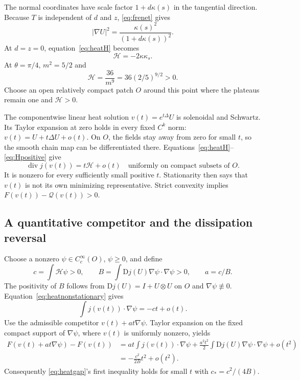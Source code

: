 \documentclass[11pt,a4paper]{article}
\theoremstyle{definition}
\theoremstyle{remark}
\newcommand{\Q}{\mathcal Q}
\newcommand{\diver}{\operatorname{div}}
\numberwithin{equation}{section}
\begin{document}
The normal coordinates have scale factor \(1+d\kappa(s)\) in the tangential direction. Because \(T\) is independent of \(d\) and \(z\), \eqref{eq:frenet} gives
\[
|\nabla U|^2=\frac{\kappa(s)^2}{(1+d\kappa(s))^2}.
\]
At \(d=z=0\), equation~\eqref{eq:heatH} becomes
\[
\mathscr H=-2\kappa\kappa_s.
\]
At \(\theta=\pi/4\), \(m^2=5/2\) and
\begin{equation}\label{eq:Hpositive}
\mathscr H=\frac{36}{m^9}=36(2/5)^{9/2}>0.
\end{equation}
Choose an open relatively compact patch \(O\) around this point where the plateaus remain one and \(\mathscr H>0\).

The componentwise linear heat solution \(v(t)=e^{t\Delta}U\) is solenoidal and Schwartz. Its Taylor expansion at zero holds in every fixed \(C^k\) norm:
\(v(t)=U+t\Delta U+o(t)\).
On \(O\), the fields stay away from zero for small \(t\), so the smooth chain map can be differentiated there. Equations~\eqref{eq:heatH}--\eqref{eq:Hpositive} give
\begin{equation}\label{eq:heatnonstationary}
\diver j(v(t))=t\mathscr H+o(t)
\quad\text{uniformly on compact subsets of }O.
\end{equation}
It is nonzero for every sufficiently small positive \(t\). Stationarity then says that \(v(t)\) is not its own minimizing representative. Strict convexity implies \(F(v(t))-\Q(v(t))>0\).

\subsection{A quantitative competitor and the dissipation reversal}
Choose a nonzero \(\psi\in C_c^\infty(O)\), \(\psi\ge0\), and define
\[
c=\int\mathscr H\psi>0,
\qquad B=\int\mathrm Dj(U)\nabla\psi\cdot\nabla\psi>0,
\qquad a=c/B.
\]
The positivity of \(B\) follows from \(\mathrm Dj(U)=I+U\otimes U\) on \(O\) and \(\nabla\psi\not\equiv0\). Equation~\eqref{eq:heatnonstationary} gives
\[
\int j(v(t))\cdot\nabla\psi=-ct+o(t).
\]
Use the admissible competitor \(v(t)+at\nabla\psi\). Taylor expansion on the fixed compact support of \(\nabla\psi\), where \(v(t)\) is uniformly nonzero, yields
\begin{align*}
F(v(t)+at\nabla\psi)-F(v(t))
&=at\int j(v(t))\cdot\nabla\psi
+\frac{a^2t^2}{2}\int\mathrm Dj(U)\nabla\psi\cdot\nabla\psi+o(t^2)\\
&=-\frac{c^2}{2B}t^2+o(t^2).
\end{align*}
Consequently \eqref{eq:heatgap}'s first inequality holds for small \(t\) with \(c_*=c^2/(4B)\).
\end{document}
